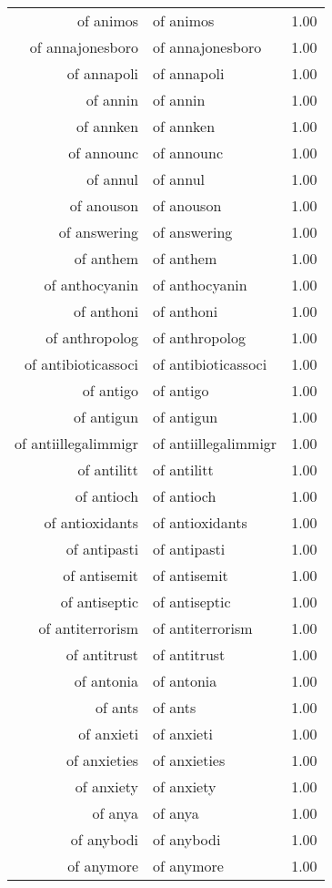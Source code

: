 \begin{table}[ht]
\begin{tabular}{rlr}
  of animos & of animos & 1.00 \\ 
  of annajonesboro & of annajonesboro & 1.00 \\ 
  of annapoli & of annapoli & 1.00 \\ 
  of annin & of annin & 1.00 \\ 
  of annken & of annken & 1.00 \\ 
  of announc & of announc & 1.00 \\ 
  of annul & of annul & 1.00 \\ 
  of anouson & of anouson & 1.00 \\ 
  of answering & of answering & 1.00 \\ 
  of anthem & of anthem & 1.00 \\ 
  of anthocyanin & of anthocyanin & 1.00 \\ 
  of anthoni & of anthoni & 1.00 \\ 
  of anthropolog & of anthropolog & 1.00 \\ 
  of antibioticassoci & of antibioticassoci & 1.00 \\ 
  of antigo & of antigo & 1.00 \\ 
  of antigun & of antigun & 1.00 \\ 
  of antiillegalimmigr & of antiillegalimmigr & 1.00 \\ 
  of antilitt & of antilitt & 1.00 \\ 
  of antioch & of antioch & 1.00 \\ 
  of antioxidants & of antioxidants & 1.00 \\ 
  of antipasti & of antipasti & 1.00 \\ 
  of antisemit & of antisemit & 1.00 \\ 
  of antiseptic & of antiseptic & 1.00 \\ 
  of antiterrorism & of antiterrorism & 1.00 \\ 
  of antitrust & of antitrust & 1.00 \\ 
  of antonia & of antonia & 1.00 \\ 
  of ants & of ants & 1.00 \\ 
  of anxieti & of anxieti & 1.00 \\ 
  of anxieties & of anxieties & 1.00 \\ 
  of anxiety & of anxiety & 1.00 \\ 
  of anya & of anya & 1.00 \\ 
  of anybodi & of anybodi & 1.00 \\ 
  of anymore & of anymore & 1.00 \\ 

\end{tabular}
\end{table}

